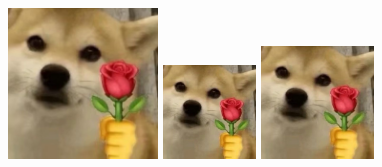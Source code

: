 \documentclass[normalsize]{article}   %
\begin{document}
		\begin{figure}[htbp!]
			\begin{minipage}{0.32\linewidth}
				\centering    
				\includegraphics[height=4cm]{img/sample.png}
			\end{minipage}
			\begin{minipage}{0.32\linewidth}
				\centering    
				\includegraphics[height=2.5cm]{img/sample.png}
			\end{minipage}
			\begin{minipage}{0.32\linewidth}
				\centering
				\includegraphics[height=3cm]{img/sample.png}
			\end{minipage}
		\end{figure}
		
\end{document}
